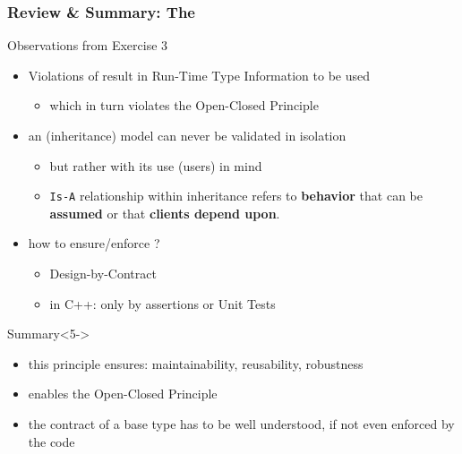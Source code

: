 \documentclass[9pt]{beamer}
\begin{document}
\begin{frame}
  \frametitle{Review \& Summary: The \secname}
  \begin{block}{Observations from Exercise 3}
    \begin{itemize}
    \item<2-> Violations of {\secname} result in Run-Time Type Information to be used
      \begin{itemize}
      \item which in turn violates the Open-Closed Principle
      \end{itemize}
    \item<3-> an (inheritance) model can never be validated in isolation 
      \begin{itemize}
      \item but rather with its use (users) in mind
      \item \texttt{Is-A} relationship within inheritance refers to \textbf{behavior} that can be \textbf{assumed} or that \textbf{clients depend upon}.
      \end{itemize}
    \item<4-> how to ensure/enforce \secname?
      \begin{itemize}
      \item Design-by-Contract 
      \item in C++: only by assertions or Unit Tests
      \end{itemize}
    \end{itemize}
  \end{block}
\pause
\vfill
\begin{block}{Summary}<5->
  \begin{itemize}
  \item this principle ensures: maintainability, reusability, robustness
  \item {\secname} enables the Open-Closed Principle
  \item the contract of a base type has to be well understood, if not even enforced by the code
  \end{itemize}
\end{block}
\end{frame}
\end{document}

